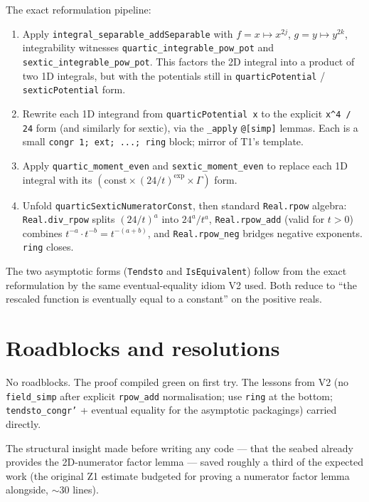 \documentclass[11pt]{article}
\begin{document}
The exact reformulation pipeline:
\begin{enumerate}[leftmargin=1.5em]
\item Apply \texttt{integral\_separable\_addSeparable} with
  $f = x \mapsto x^{2j}$, $g = y \mapsto y^{2k}$, integrability
  witnesses \texttt{quartic\_integrable\_pow\_pot} and
  \texttt{sextic\_integrable\_pow\_pot}. This factors the 2D integral
  into a product of two 1D integrals, but with the potentials still
  in \texttt{quarticPotential} / \texttt{sexticPotential} form.
\item Rewrite each 1D integrand from \texttt{quarticPotential x} to
  the explicit \texttt{x\textasciicircum 4 / 24} form (and similarly
  for sextic), via the \texttt{\_apply} \texttt{@[simp]} lemmas.
  Each is a small \texttt{congr 1; ext; ...; ring} block; mirror of
  T1's template.
\item Apply \texttt{quartic\_moment\_even} and
  \texttt{sextic\_moment\_even} to replace each 1D integral with its
  $(\text{const} \times (24/t)^{\text{exp}} \times \Gamma)$ form.
\item Unfold \texttt{quarticSexticNumeratorConst}, then standard
  \texttt{Real.rpow} algebra: \texttt{Real.div\_rpow} splits
  $(24/t)^a$ into $24^a / t^a$, \texttt{Real.rpow\_add} (valid for
  $t > 0$) combines $t^{-a} \cdot t^{-b} = t^{-(a + b)}$, and
  \texttt{Real.rpow\_neg} bridges negative exponents.
  \texttt{ring} closes.
\end{enumerate}

The two asymptotic forms (\texttt{Tendsto} and
\texttt{IsEquivalent}) follow from the exact reformulation by the
same eventual-equality idiom V2 used. Both reduce to ``the rescaled
function is eventually equal to a constant'' on the positive reals.

\section{Roadblocks and resolutions}

No roadblocks. The proof compiled green on first try. The lessons
from V2 (no \texttt{field\_simp} after explicit \texttt{rpow\_add}
normalisation; use \texttt{ring} at the bottom; \texttt{tendsto\_congr'}
+ eventual equality for the asymptotic packagings) carried directly.

The structural insight made before writing any code --- that the
seabed already provides the 2D-numerator factor lemma --- saved
roughly a third of the expected work (the original Z1 estimate
budgeted for proving a numerator factor lemma alongside,
${\sim}30$ lines).
\end{document}
